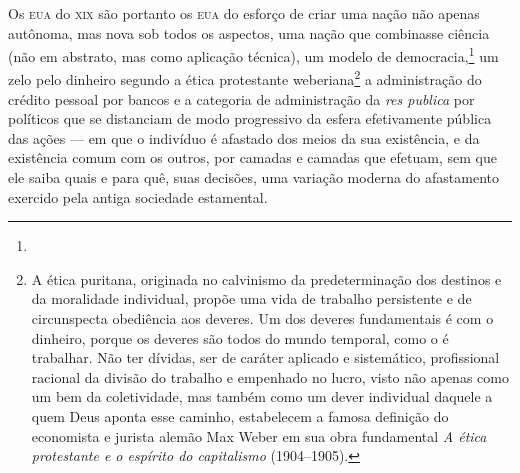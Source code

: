 Os \textsc{eua} do \textsc{xix} são portanto os \textsc{eua} do esforço de criar uma nação não
apenas autônoma, mas nova sob todos os aspectos, uma nação que
combinasse ciência (não em abstrato, mas como aplicação técnica),
um modelo de democracia,\footnote{} um
zelo pelo dinheiro segundo a ética protestante weberiana\footnote{A
  ética puritana, originada no calvinismo da predeterminação dos
  destinos e da moralidade individual, propõe uma vida de trabalho
  persistente e de circunspecta obediência aos deveres. Um dos deveres
  fundamentais é com o dinheiro, porque os deveres são todos do mundo
  temporal, como o é trabalhar. Não ter dívidas, ser de caráter aplicado
  e sistemático, profissional racional da divisão do trabalho e
  empenhado no lucro, visto não apenas como um bem da
  coletividade, mas também como um dever individual daquele a
  quem Deus aponta esse caminho, estabelecem a famosa definição do
  economista e jurista alemão Max Weber em sua obra
  fundamental \emph{A ética protestante e o espírito do capitalismo}
  (1904--1905).}  a administração do crédito pessoal por bancos e a categoria
de administração da \emph{res publica} por políticos que se distanciam
de modo progressivo da esfera efetivamente pública das ações --- em que
o indivíduo é afastado dos meios da sua existência, e da existência
comum com os outros, por camadas e camadas que efetuam, sem que
ele saiba quais e para quê, suas decisões, uma variação moderna do
afastamento exercido pela antiga sociedade estamental.

